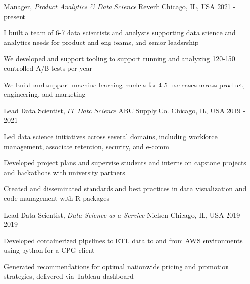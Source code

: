 
\begin{cventries}

  \cventry
    {Manager, \textit{Product Analytics \& Data Science}} %
    {Reverb} %
    {Chicago, IL, USA} %
    {2021 - present} %
    {
      \begin{cvitems}
        \item {I built a team of 6-7 data scientists and analysts supporting data science and analytics needs for product and eng teams, and senior leadership}
        \item {We developed and support tooling to support running and analyzing 120-150 controlled A/B tests per year}
        \item {We build and support machine learning models for 4-5 use cases across product, engineering, and marketing}  
      \end{cvitems}
    }

  \cventry
    {Lead Data Scientist, \textit{IT Data Science}} %
    {ABC Supply Co.} %
    {Chicago, IL, USA} %
    {2019 - 2021} %
    {
      \begin{cvitems}
        \item {Led data science initiatives across several domains, including workforce management, associate retention, security, and e-comm}
        \item {Developed project plans and supervise students and interns on capstone projects and hackathons with university partners}
        \item {Created and disseminated standards and best practices in data visualization and code management with R packages}
      \end{cvitems}
    }

 \cventry
    {Lead Data Scientist, \textit{Data Science as a Service}} %
    {Nielsen} %
    {Chicago, IL, USA} %
    {2019 - 2019} %
    {
      \begin{cvitems}
        \item {Developed containerized pipelines to ETL data to and from AWS environments using python for a CPG client}
        \item {Generated recommendations for optimal nationwide pricing and promotion strategies, delivered via Tableau dashboard}
      \end{cvitems}
    }


\end{cventries}
